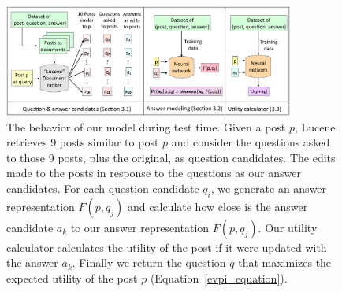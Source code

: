 \documentclass[11pt]{report}
\begin{document}




\begin{figure}[t]
\centering
\includegraphics[width=0.85\textwidth]{model}
\caption{\small The behavior of our model during test time. Given a post $p$, Lucene retrieves 9 posts similar to post $p$ and consider the questions asked to those 9 posts, plus the original, as question candidates. The edits made to the posts in response to the questions as our answer candidates. For each question candidate $q_i$, we generate an answer representation $F(p,q_j)$ and calculate how close is the answer candidate $a_k$ to our answer representation $F(p,q_j)$. Our utility calculator calculates the utility of the post if it were updated with the answer $a_k$. Finally we return the question $q$ that maximizes the expected utility of the post $p$ (Equation~\ref{evpi_equation}).}
\label{model}
\end{figure}
\end{document}
